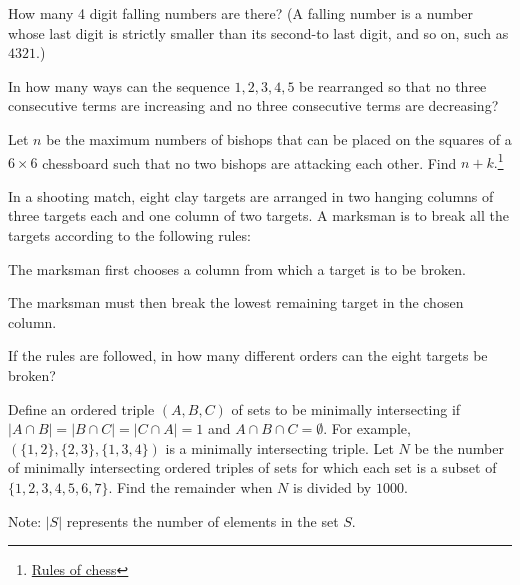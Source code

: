 \documentclass[blue,onecol]{shooting}
\begin{document}
\begin{req}[]{6}
How many 4 digit falling numbers are there? (A falling number is a number whose last digit is strictly smaller than its second-to last digit, and so on, such as $4321.$)
\end{req}

\begin{prob}[AMC 10A 2021/21]{6}
In how many ways can the sequence $1, 2, 3, 4, 5$ be rearranged so that no three consecutive terms are increasing and no three consecutive terms are decreasing?
\end{prob}

\begin{prob}{6}
Let $n$ be the maximum numbers of bishops that can be placed on the squares of a $6\times 6$ chessboard such that no two bishops are attacking each other. Find $n+k.$\footnote{\href{https://www.ichess.net/blog/chess-pieces-moves/}{Rules of chess}}
\end{prob}

\begin{prob}[AIME 1990/8]{9}
In a shooting match, eight clay targets are arranged in two hanging columns of three targets each and one column of two targets. A marksman is to break all the targets according to the following rules:

    \begin{itemize}
         \Item The marksman first chooses a column from which a target is to be broken.

         \Item The marksman must then break the lowest remaining target in the chosen column.
    \end{itemize}

    If the rules are followed, in how many different orders can the eight targets be broken?
\end{prob}
    
\begin{prob}[AIME I 2010/7]{13}
Define an ordered triple $(A, B, C)$ of sets to be minimally intersecting if $|A \cap B| = |B \cap C| = |C \cap A| = 1$ and $ A \cap B \cap C = \emptyset$. For example, $(\{1,2\},\{2,3\},\{1,3,4\})$ is a minimally intersecting triple. Let $N$ be the number of minimally intersecting ordered triples of sets for which each set is a subset of $\{1,2,3,4,5,6,7\}$. Find the remainder when $N$ is divided by $1000$.

Note: $|S|$ represents the number of elements in the set $S.$
\end{prob}
\end{document}
